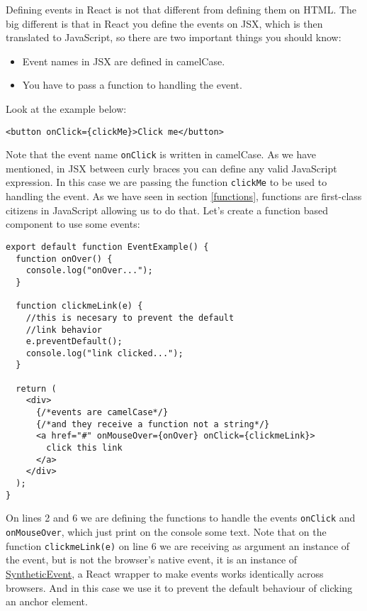 \documentclass[a4paper, oneside, titlepage, 12pt]{book}
\begin{document}
Defining events in React is not that different from defining them on HTML. The big different is that in React you define the events on JSX, which is then translated to JavaScript, so there are two important things you should know:

\begin{itemize}
 \item Event names in JSX are defined in camelCase.
 \item You have to pass a function to handling the event. 
\end{itemize}

Look at the example below:

\begin{verbatim}
<button onClick={clickMe}>Click me</button>
\end{verbatim}

Note that the event name \texttt{onClick} is written in camelCase. As we have mentioned, in JSX between curly braces you can define any valid JavaScript expression. In this case we are passing the function \texttt{clickMe} to be used to handling the event. As we have seen in section \ref{functions}, functions are first-class citizens in JavaScript allowing us to do that. Let's create a function based component to use some events:

\begin{verbatim}
export default function EventExample() {
  function onOver() {
    console.log("onOver...");
  }

  function clickmeLink(e) {
    //this is necesary to prevent the default
    //link behavior
    e.preventDefault();
    console.log("link clicked...");
  }

  return (
    <div>
      {/*events are camelCase*/}
      {/*and they receive a function not a string*/}
      <a href="#" onMouseOver={onOver} onClick={clickmeLink}>
        click this link
      </a>
    </div>
  );
}
\end{verbatim}

On lines 2 and 6 we are defining the functions to handle the events \texttt{onClick} and \texttt{onMouseOver}, which just print on the console some text. Note that on the function \texttt{clickmeLink(e)} on line 6 we are receiving as argument an instance of the event, but is not the browser's native event, it is an instance of \href{https://reactjs.org/docs/events.html}{SyntheticEvent}, a React wrapper to make events works identically across browsers. And in this case we use it to prevent the default behaviour of clicking an anchor element.
\newline
\end{document}
